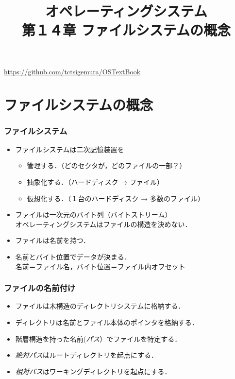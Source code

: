 \documentclass[unicode,handout]{beamer}                   %
\begin{document}
\title[ファイルシステムの概念]
      {オペレーティングシステム\\第１４章 ファイルシステムの概念}
\date{}
\begin{frame}
  \titlepage
  \centerline{\url{https://github.com/tctsigemura/OSTextBook}}
\end{frame}


\section{ファイルシステムの概念}
\begin{frame}
  \frametitle{ファイルシステム}
  \begin{itemize}
  \item ファイルシステムは二次記憶装置を
    \begin{itemize}
    \item 管理する．（どのセクタが，どのファイルの一部？）
    \item 抽象化する．（ハードディスク → ファイル）
    \item 仮想化する．（１台のハードディスク → 多数のファイル）
    \end{itemize}
  \item ファイルは一次元のバイト列（バイトストリーム） \\
    オペレーティングシステムはファイルの構造を決めない．
  \item ファイルは名前を持つ．
  \item 名前とバイト位置でデータが決まる．\\
    名前＝ファイル名，バイト位置＝ファイル内オフセット
  \end{itemize}
\end{frame}

\begin{frame}
  \frametitle{ファイルの名前付け}
  \begin{itemize}
  \item ファイルは木構造のディレクトリシステムに格納する．
  \item ディレクトリは名前とファイル本体のポインタを格納する．
  \item 階層構造を持った名前(\emph{パス}）でファイルを特定する．
  \item \emph{絶対パス}はルートディレクトリを起点にする．
  \item \emph{相対パス}はワーキングディレクトリを起点にする．
  \end{itemize}

\end{frame}
\end{document}
